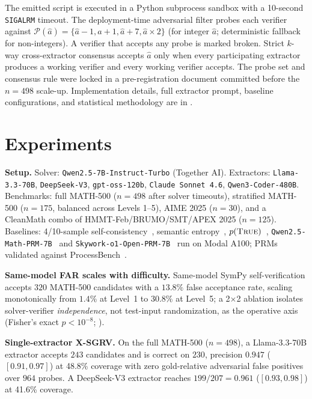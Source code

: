 \documentclass{article}
\begin{document}
The emitted script is executed in a Python subprocess sandbox with a 10-second \texttt{SIGALRM} timeout. The deployment-time adversarial filter probes each verifier against $\mathcal{P}(\hat a) = \{\hat a-1,\hat a+1,\hat a+7,\hat a\times 2\}$ (for integer $\hat a$; deterministic fallback for non-integers). A verifier that accepts any probe is marked broken. Strict $k$-way cross-extractor consensus accepts $\hat a$ only when every participating extractor produces a working verifier and every working verifier accepts. The probe set and consensus rule were locked in a pre-registration document committed before the $n{=}498$ scale-up. Implementation details, full extractor prompt, baseline configurations, and statistical methodology are in .

\section{Experiments}
\label{sec:exp}

\textbf{Setup.} Solver: \texttt{Qwen2.5-7B-Instruct-Turbo} (Together AI). Extractors: \texttt{Llama-3.3-70B}, \texttt{DeepSeek-V3}, \texttt{gpt-oss-120b}, \texttt{Claude Sonnet 4.6}, \texttt{Qwen3-Coder-480B}. Benchmarks: full MATH-500 ($n{=}498$ after solver timeouts), stratified MATH-500 ($n{=}175$, balanced across Levels 1--5), AIME 2025 ($n{=}30$), and a CleanMath combo of HMMT-Feb/BRUMO/SMT/APEX 2025 ($n{=}125$). Baselines: 4/10-sample self-consistency~\citep{wang2023selfconsistency}, semantic entropy~\citep{kuhn2023semantic,farquhar2024nature}, $p(\textsc{True})$~\citep{kadavath2022}, \texttt{Qwen2.5-Math-PRM-7B}~\citep{qwenprm2025} and \texttt{Skywork-o1-Open-PRM-7B}~\citep{skyworkprm2024} run on Modal A100; PRMs validated against ProcessBench~\citep{processbench2024}.

\textbf{Same-model FAR scales with difficulty.} Same-model SymPy self-verification accepts $320$ MATH-500 candidates with a $13.8\%$ false acceptance rate, scaling monotonically from $1.4\%$ at Level~1 to $30.8\%$ at Level~5; a 2$\times$2 ablation isolates solver-verifier \emph{independence}, not test-input randomization, as the operative axis (Fisher's exact $p<10^{-8}$; ).

\textbf{Single-extractor X-SGRV.} On the full MATH-500 ($n{=}498$), a Llama-3.3-70B extractor accepts $243$ candidates and is correct on $230$, precision $0.947$ ($[0.91, 0.97]$) at 48.8\% coverage with zero gold-relative adversarial false positives over $964$ probes. A DeepSeek-V3 extractor reaches $199/207 = 0.961$ ($[0.93, 0.98]$) at 41.6\% coverage.
\end{document}
